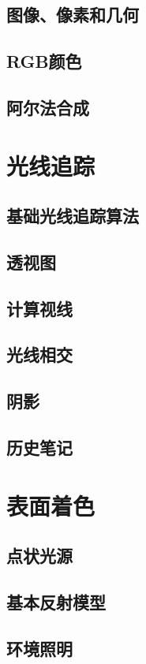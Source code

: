 \documentclass[lang=cn,10pt]{elegantbook}
\begin{document}
\section{图像、像素和几何}

\section{RGB颜色}

\section{阿尔法合成}

\chapter{光线追踪}

\section{基础光线追踪算法}

\section{透视图}

\section{计算视线}

\section{光线相交}

\section{阴影}

\section{历史笔记}

\chapter{表面着色}

\section{点状光源}


\section{基本反射模型}


\section{环境照明}
\end{document}
